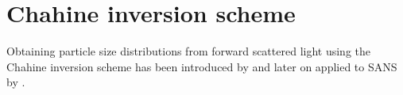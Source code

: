 \section{Chahine inversion scheme}
Obtaining particle size distributions from forward scattered light using the Chahine inversion scheme has been introduced by \cite{Santer1983} and later on applied to SANS by \cite{Sen2014}.

